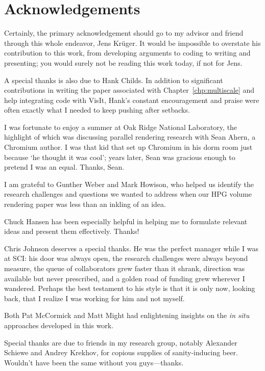 \section*{Acknowledgements}

Certainly, the primary acknowledgement should go to my advisor and
friend through this whole endeavor, Jens Kr\"uger.  It would be
impossible to overstate his contribution to this work, from developing
arguments to coding to writing and presenting; you would surely not be
reading this work today, if not for Jens.

A special thanks is also due to Hank Childs.  In addition to
significant contributions in writing the paper associated with
Chapter~\ref{chp:multiscale} and help integrating code with VisIt,
Hank's constant encouragement and praise were often exactly what I
needed to keep pushing after setbacks.

I was fortunate to enjoy a summer at Oak Ridge National Laboratory, the
highlight of which was discussing parallel rendering research with Sean
Ahern, a Chromium author.  I was that kid that set up Chromium in his
dorm room just because `he thought it was cool'; years later, Sean was
gracious enough to pretend I was an equal.  Thanks, Sean.

I am grateful to Gunther Weber and Mark Howison, who helped us identify
the research challenges and questions we wanted to address when our HPG
volume rendering paper was less than an inkling of an idea.

Chuck Hansen has been especially helpful in helping me to formulate
relevant ideas and present them effectively.  Thanks!


Chris Johnson deserves a special thanks.  He was the perfect manager
while I was at SCI: his door was always open, the research challenges
were always beyond measure, the queue of collaborators grew faster than
it shrank, direction was available but never prescribed, and a golden
road of funding grew wherever I wandered.  Perhaps the best testament
to his style is that it is only now, looking back, that I realize I was
working for him and not myself.

Both Pat McCormick and Matt Might had enlightening insights on the
\textit{in situ} approaches developed in this work.

Special thanks are due to friends in my research group, notably
Alexander Schiewe and Andrey Krekhov, for copious supplies of
sanity-inducing beer.  Wouldn't have been the same without you
guys---thanks.

